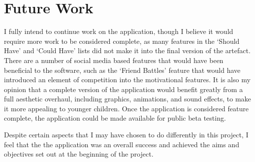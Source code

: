 \section{Future Work}
I fully intend to continue work on the application, though I believe it would require more work to be considered complete, as many features in the `Should Have' and `Could Have' lists did not make it into the final version of the artefact.
There are a number of social media based features that would have been beneficial to the software, such as the `Friend Battles' feature that would have introduced an element of competition into the motivational features.
It is also my opinion that a complete version of the application would benefit greatly from a full aesthetic overhaul, including graphics, animations, and sound effects, to make it more appealing to younger children.
Once the application is considered feature complete, the application could be made available for public beta testing.

Despite certain aspects that I may have chosen to do differently in this project, I feel that the the application was an overall success and achieved the aims and objectives set out at the beginning of the project.